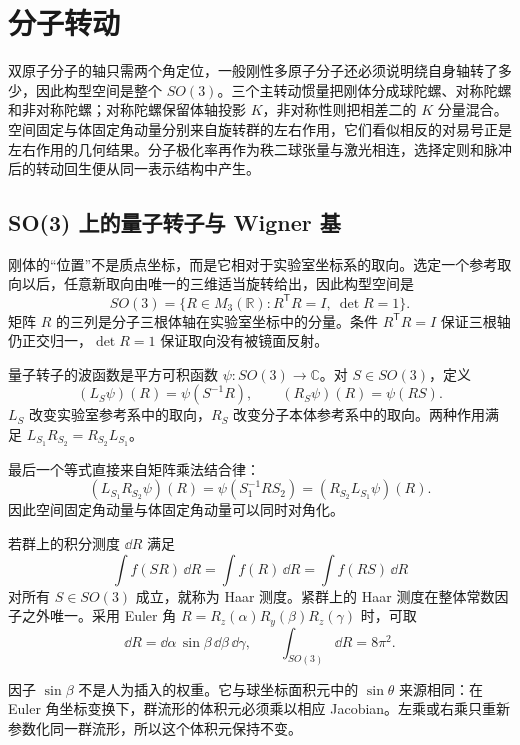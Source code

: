 \section{分子转动}
\label{ch:molecular-rotation}

双原子分子的轴只需两个角定位，一般刚性多原子分子还必须说明绕自身轴转了多少，因此构型空间是整个 \(SO(3)\)。三个主转动惯量把刚体分成球陀螺、对称陀螺和非对称陀螺；对称陀螺保留体轴投影 \(K\)，非对称性则把相差二的 \(K\) 分量混合。空间固定与体固定角动量分别来自旋转群的左右作用，它们看似相反的对易号正是左右作用的几何结果。分子极化率再作为秩二球张量与激光相连，选择定则和脉冲后的转动回生便从同一表示结构中产生。
\subsection{SO(3) 上的量子转子与 Wigner 基}

刚体的“位置”不是质点坐标，而是它相对于实验室坐标系的取向。选定一个参考取向以后，任意新取向由唯一的三维适当旋转给出，因此构型空间是
\[
SO(3)=\{R\in M_3(\mathbb R):R^{\mathsf T}R=I,\ \det R=1\}.
\]
矩阵 \(R\) 的三列是分子三根体轴在实验室坐标中的分量。条件
\(R^{\mathsf T}R=I\) 保证三根轴仍正交归一，\(\det R=1\) 保证取向没有被镜面反射。

\begin{definition}[群上的波函数与左右作用]
量子转子的波函数是平方可积函数
\(\psi:SO(3)\to\mathbb C\)。对 \(S\in SO(3)\)，定义
\[
(L_S\psi)(R)=\psi(S^{-1}R),\qquad
(R_S\psi)(R)=\psi(RS).
\]
\(L_S\) 改变实验室参考系中的取向，\(R_S\) 改变分子本体参考系中的取向。两种作用满足
\(L_{S_1}R_{S_2}=R_{S_2}L_{S_1}\)。
\end{definition}

最后一个等式直接来自矩阵乘法结合律：
\[
(L_{S_1}R_{S_2}\psi)(R)
=\psi(S_1^{-1}RS_2)
=(R_{S_2}L_{S_1}\psi)(R).
\]
因此空间固定角动量与体固定角动量可以同时对角化。

\begin{definition}[Haar 测度]
若群上的积分测度 \(\dd R\) 满足
\[
\int f(SR)\,\dd R=\int f(R)\,\dd R
=\int f(RS)\,\dd R
\]
对所有 \(S\in SO(3)\) 成立，就称为 Haar 测度。紧群上的 Haar 测度在整体常数因子之外唯一。采用 Euler 角
\(R=R_z(\alpha)R_y(\beta)R_z(\gamma)\) 时，可取
\[
\dd R=\dd\alpha\,\sin\beta\,\dd\beta\,\dd\gamma,
\qquad
\int_{SO(3)}\dd R=8\pi^2.
\]
\end{definition}

因子 \(\sin\beta\) 不是人为插入的权重。它与球坐标面积元中的
\(\sin\theta\) 来源相同：在 Euler 角坐标变换下，群流形的体积元必须乘以相应 Jacobian。左乘或右乘只重新参数化同一群流形，所以这个体积元保持不变。

